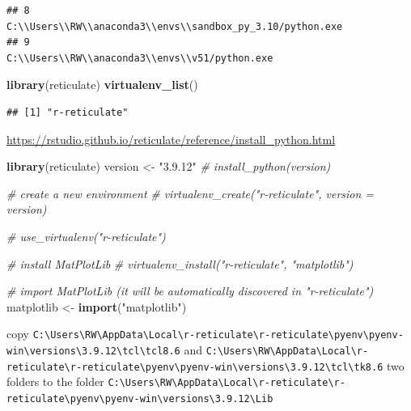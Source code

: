 \documentclass[
]{book}
\newenvironment{Shaded}{\begin{snugshade}}{\end{snugshade}}
\newcommand{\CommentTok}[1]{\textcolor[rgb]{0.56,0.35,0.01}{\textit{#1}}}
\newcommand{\FunctionTok}[1]{\textcolor[rgb]{0.13,0.29,0.53}{\textbf{#1}}}
\newcommand{\NormalTok}[1]{#1}
\newcommand{\OtherTok}[1]{\textcolor[rgb]{0.56,0.35,0.01}{#1}}
\newcommand{\StringTok}[1]{\textcolor[rgb]{0.31,0.60,0.02}{#1}}
\theoremstyle{definition}
\theoremstyle{definition}
\theoremstyle{definition}
\theoremstyle{definition}
\theoremstyle{remark}
\begin{document}
\begin{verbatim}
## 8          C:\\Users\\RW\\anaconda3\\envs\\sandbox_py_3.10/python.exe
## 9                      C:\\Users\\RW\\anaconda3\\envs\\v51/python.exe
\end{verbatim}

\begin{Shaded}
\begin{Highlighting}[]
\FunctionTok{library}\NormalTok{(reticulate)}
\FunctionTok{virtualenv\_list}\NormalTok{()}
\end{Highlighting}
\end{Shaded}

\begin{verbatim}
## [1] "r-reticulate"
\end{verbatim}

\url{https://rstudio.github.io/reticulate/reference/install_python.html}

\begin{Shaded}
\begin{Highlighting}[]
\FunctionTok{library}\NormalTok{(reticulate)}
\NormalTok{version }\OtherTok{\textless{}{-}} \StringTok{"3.9.12"}
\CommentTok{\# install\_python(version)}

\CommentTok{\# create a new environment}
\CommentTok{\# virtualenv\_create("r{-}reticulate", version = version)}

\CommentTok{\# use\_virtualenv("r{-}reticulate")}

\CommentTok{\# install MatPlotLib}
\CommentTok{\# virtualenv\_install("r{-}reticulate", "matplotlib")}

\CommentTok{\# import MatPlotLib (it will be automatically discovered in "r{-}reticulate")}
\NormalTok{matplotlib }\OtherTok{\textless{}{-}} \FunctionTok{import}\NormalTok{(}\StringTok{"matplotlib"}\NormalTok{)}
\end{Highlighting}
\end{Shaded}

copy \texttt{C:\textbackslash{}Users\textbackslash{}RW\textbackslash{}AppData\textbackslash{}Local\textbackslash{}r-reticulate\textbackslash{}r-reticulate\textbackslash{}pyenv\textbackslash{}pyenv-win\textbackslash{}versions\textbackslash{}3.9.12\textbackslash{}tcl\textbackslash{}tcl8.6} and \texttt{C:\textbackslash{}Users\textbackslash{}RW\textbackslash{}AppData\textbackslash{}Local\textbackslash{}r-reticulate\textbackslash{}r-reticulate\textbackslash{}pyenv\textbackslash{}pyenv-win\textbackslash{}versions\textbackslash{}3.9.12\textbackslash{}tcl\textbackslash{}tk8.6} two folders to the folder \texttt{C:\textbackslash{}Users\textbackslash{}RW\textbackslash{}AppData\textbackslash{}Local\textbackslash{}r-reticulate\textbackslash{}r-reticulate\textbackslash{}pyenv\textbackslash{}pyenv-win\textbackslash{}versions\textbackslash{}3.9.12\textbackslash{}Lib}
\end{document}
